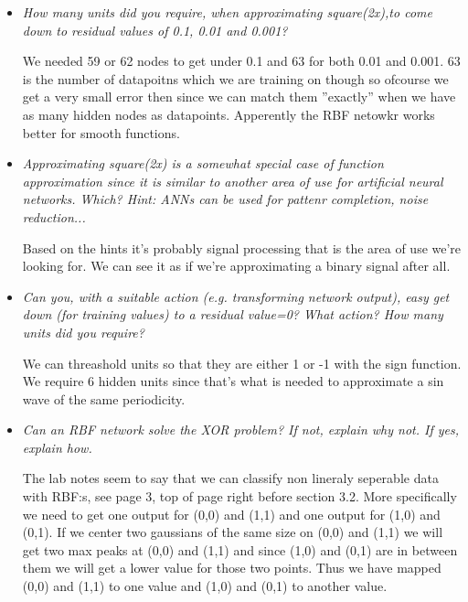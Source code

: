\documentclass[a4paper,11pt]{article}
\begin{document}
\begin{itemize}
\begin{figure}[h!]
\label{fig2}
\caption{}
\end{figure}

\item \textit{How many units did you require, when approximating square(2x),to come down to residual values of 0.1, 0.01 and 0.001?}

We needed 59 or 62 nodes to get under 0.1 and 63 for both 0.01 and 0.001. 63 is the number of datapoitns which we are training on though so ofcourse we get a very small error then since we can match them ''exactly'' when we have as many hidden nodes as datapoints. Apperently the RBF netowkr works better for smooth functions.

\item \textit{Approximating square(2x) is a somewhat special case of function approximation since it is similar to another area of use for artificial neural networks. Which? Hint: ANNs can be used for pattenr completion, noise reduction...}

Based on the hints it's probably signal processing that is the area of use we're looking for. We can see it as if we're approximating a binary signal after all.

\item \textit{Can you, with a suitable action (e.g. transforming network output), easy get down (for training values) to a residual value=0? What action? How many units did you require?}

We can threashold units so that they are either 1 or -1 with the sign function. We require 6 hidden units since that's what is needed to approximate a sin wave of the same periodicity.

\item \textit{Can an RBF network solve the XOR problem? If not, explain why not. If yes, explain how.}

The lab notes seem to say that we can classify non lineraly seperable data with RBF:s, see page 3, top of page right before section 3.2. More specifically we need to get one output for (0,0) and (1,1) and one output for (1,0) and (0,1). If we center two gaussians of the same size on (0,0) and (1,1) we will get two max peaks at (0,0) and (1,1) and since (1,0) and (0,1) are in between them we will get a lower value for those two points. Thus we have mapped (0,0) and (1,1) to one value and (1,0) and (0,1) to another value.
\end{itemize}
\end{document}

